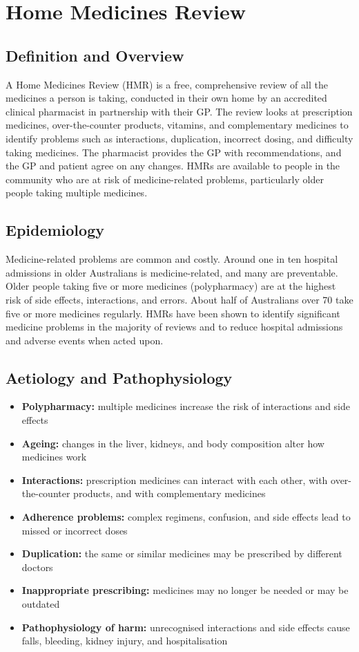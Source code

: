 \chapter{Home Medicines Review}

\section*{Definition and Overview}
A Home Medicines Review (HMR) is a free, comprehensive review of all the medicines a person is taking, conducted in their own home by an accredited clinical pharmacist in partnership with their GP. The review looks at prescription medicines, over-the-counter products, vitamins, and complementary medicines to identify problems such as interactions, duplication, incorrect dosing, and difficulty taking medicines. The pharmacist provides the GP with recommendations, and the GP and patient agree on any changes. HMRs are available to people in the community who are at risk of medicine-related problems, particularly older people taking multiple medicines.

\section*{Epidemiology}
Medicine-related problems are common and costly. Around one in ten hospital admissions in older Australians is medicine-related, and many are preventable. Older people taking five or more medicines (polypharmacy) are at the highest risk of side effects, interactions, and errors. About half of Australians over 70 take five or more medicines regularly. HMRs have been shown to identify significant medicine problems in the majority of reviews and to reduce hospital admissions and adverse events when acted upon.

\section*{Aetiology and Pathophysiology}
\begin{itemize}
    \item \textbf{Polypharmacy:} multiple medicines increase the risk of interactions and side effects
    \item \textbf{Ageing:} changes in the liver, kidneys, and body composition alter how medicines work
    \item \textbf{Interactions:} prescription medicines can interact with each other, with over-the-counter products, and with complementary medicines
    \item \textbf{Adherence problems:} complex regimens, confusion, and side effects lead to missed or incorrect doses
    \item \textbf{Duplication:} the same or similar medicines may be prescribed by different doctors
    \item \textbf{Inappropriate prescribing:} medicines may no longer be needed or may be outdated
    \item \textbf{Pathophysiology of harm:} unrecognised interactions and side effects cause falls, bleeding, kidney injury, and hospitalisation
\end{itemize}


